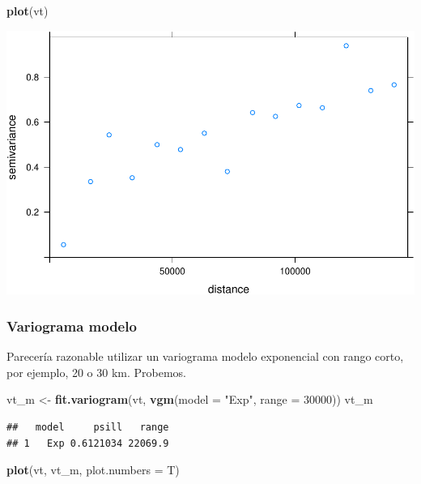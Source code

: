 \documentclass[11pt,]{article}
\newenvironment{Shaded}{\begin{snugshade}}{\end{snugshade}}
\newcommand{\KeywordTok}[1]{\textcolor[rgb]{0.13,0.29,0.53}{\textbf{#1}}}
\newcommand{\DataTypeTok}[1]{\textcolor[rgb]{0.13,0.29,0.53}{#1}}
\newcommand{\DecValTok}[1]{\textcolor[rgb]{0.00,0.00,0.81}{#1}}
\newcommand{\StringTok}[1]{\textcolor[rgb]{0.31,0.60,0.02}{#1}}
\newcommand{\NormalTok}[1]{#1}
\begin{document}
\begin{Shaded}
\begin{Highlighting}[]
\KeywordTok{plot}\NormalTok{(vt)}
\end{Highlighting}
\end{Shaded}

\includegraphics[width=800px]{Proyecto-Precipitaciones_files/figure-latex/vgm-temp-1}

\subsubsection{Variograma modelo}\label{variograma-modelo-1}

Parecería razonable utilizar un variograma modelo exponencial con rango
corto, por ejemplo, 20 o 30 km. Probemos.

\begin{Shaded}
\begin{Highlighting}[]
\NormalTok{vt_m <-}\StringTok{ }\KeywordTok{fit.variogram}\NormalTok{(vt, }\KeywordTok{vgm}\NormalTok{(}\DataTypeTok{model =} \StringTok{"Exp"}\NormalTok{, }\DataTypeTok{range =} \DecValTok{30000}\NormalTok{))}
\NormalTok{vt_m}
\end{Highlighting}
\end{Shaded}

\begin{verbatim}
##   model     psill   range
## 1   Exp 0.6121034 22069.9
\end{verbatim}

\begin{Shaded}
\begin{Highlighting}[]
\KeywordTok{plot}\NormalTok{(vt, vt_m, }\DataTypeTok{plot.numbers =}\NormalTok{ T)}
\end{Highlighting}
\end{Shaded}
\end{document}
